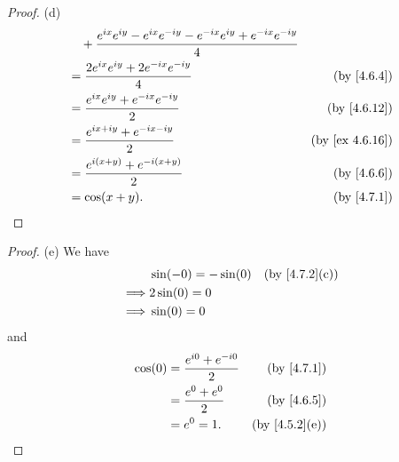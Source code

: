 \begin{proof}{(d)}
\begin{align*}
     & \quad + \frac{e^{i x} e^{i y} - e^{i x} e^{- i y} - e^{- i x} e^{i y} + e^{- i x} e^{- i y}}{4}                                                              \\
     & = \frac{2 e^{i x} e^{i y} + 2 e^{- i x} e^{- i y}}{4}                                                                         & \text{(by \cref{4.6.4})}     \\
     & = \frac{e^{i x} e^{i y} + e^{- i x} e^{- i y}}{2}                                                                             & \text{(by \cref{4.6.12})}    \\
     & = \frac{e^{i x + i y} + e^{- i x - i y}}{2}                                                                                   & \text{(by \cref{ex 4.6.16})} \\
     & = \frac{e^{i (x + y)} + e^{- i (x + y)}}{2}                                                                                   & \text{(by \cref{4.6.6})}     \\
     & = \cos(x + y).                                                                                                                & \text{(by \cref{4.7.1})}
  \end{align*}
\end{proof}

\begin{proof}{(e)}
  We have
  \begin{align*}
             & \sin(-0) = -\sin(0) & \text{(by \cref{4.7.2}(c))} \\
    \implies & 2 \sin(0) = 0                                     \\
    \implies & \sin(0) = 0
  \end{align*}
  and
  \begin{align*}
    \cos(0) & = \frac{e^{i 0} + e^{- i 0}}{2} & \text{(by \cref{4.7.1})}    \\
            & = \frac{e^{0} + e^{0}}{2}       & \text{(by \cref{4.6.5})}    \\
            & = e^0 = 1.                      & \text{(by \cref{4.5.2}(e))}
  \end{align*}
\end{proof}

